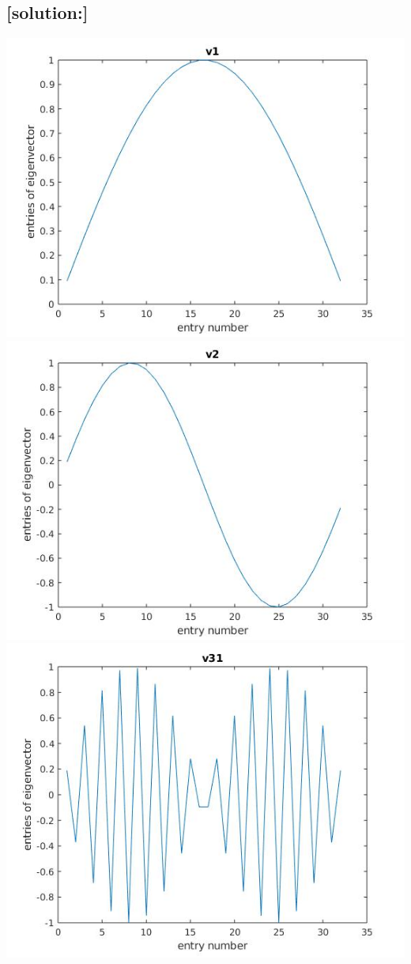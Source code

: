 \documentclass[12pt]{article}
\begin{document}
        \subsection*{[solution:]}
        \includegraphics[scale=0.5]{v1.jpg}
        \includegraphics[scale=0.5]{v2.jpg}\\
        \includegraphics[scale=0.5]{v31.jpg}
\end{document}
